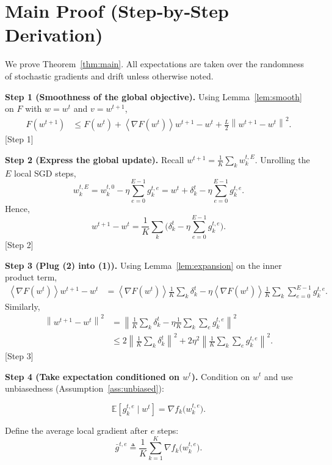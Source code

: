 \documentclass{article}
\newcommand{\E}{\mathbb{E}}
\newcommand{\norm}[1]{\left\lVert#1\right\rVert}
\newcommand{\inner}[1]{\left\langle#1\right\rangle}
\begin{document}
\section*{Main Proof (Step‑by‑Step Derivation)}
We prove Theorem~\ref{thm:main}.  All expectations are taken over the randomness of stochastic gradients and drift unless otherwise noted.

\bigskip
\noindent\textbf{Step 1 (Smoothness of the global objective).}  
Using Lemma~\ref{lem:smooth} on $F$ with $w = w^{t}$ and $v = w^{t+1}$,
\begin{align}
    F(w^{t+1})
    &\le F(w^{t}) + \inner{\nabla F(w^{t})}{w^{t+1}-w^{t}} + \frac{L}{2}\norm{w^{t+1}-w^{t}}^{2}. \tag{1}
\end{align}
[Step 1]

\noindent\textbf{Step 2 (Express the global update).}  
Recall $w^{t+1}= \frac1K\sum_{k} w_{k}^{t,E}$.  Unrolling the $E$ local SGD steps,
\[
    w_{k}^{t,E}= w_{k}^{t,0} - \eta\sum_{e=0}^{E-1} g_{k}^{t,e}
               = w^{t}+\delta_{k}^{t} - \eta\sum_{e=0}^{E-1} g_{k}^{t,e}.
\]
Hence,
\[
    w^{t+1}-w^{t}= \frac1K\sum_{k} \bigl(\delta_{k}^{t} - \eta\sum_{e=0}^{E-1} g_{k}^{t,e}\bigr). \tag{2}
\]
[Step 2]

\noindent\textbf{Step 3 (Plug (2) into (1)).}  
Using Lemma~\ref{lem:expansion} on the inner product term,
\begin{align}
    \inner{\nabla F(w^{t})}{w^{t+1}-w^{t}}
    &= \inner{\nabla F(w^{t})}{\frac1K\sum_{k}\delta_{k}^{t}}
       -\eta\inner{\nabla F(w^{t})}{\frac1K\sum_{k}\sum_{e=0}^{E-1} g_{k}^{t,e}}. \tag{3}
\end{align}
Similarly,
\begin{align}
    \norm{w^{t+1}-w^{t}}^{2}
    &= \norm{\frac1K\sum_{k}\delta_{k}^{t} - \eta\frac1K\sum_{k}\sum_{e} g_{k}^{t,e}}^{2} \nonumber\\
    &\le 2\norm{\frac1K\sum_{k}\delta_{k}^{t}}^{2}
        + 2\eta^{2}\norm{\frac1K\sum_{k}\sum_{e} g_{k}^{t,e}}^{2}. \tag{4}
\end{align}
[Step 3]

\noindent\textbf{Step 4 (Take expectation conditioned on $w^{t}$).}  
Condition on $w^{t}$ and use unbiasedness (Assumption~\ref{ass:unbiased}):

\[
    \E\!\left[g_{k}^{t,e}\mid w^{t}\right] = \nabla f_{k}\!\bigl(w_{k}^{t,e}\bigr).
\]

Define the average local gradient after $e$ steps:
\[
    \bar{g}^{t,e}\triangleq \frac1K\sum_{k=1}^{K}\nabla f_{k}\!\bigl(w_{k}^{t,e}\bigr).
\]
\end{document}
